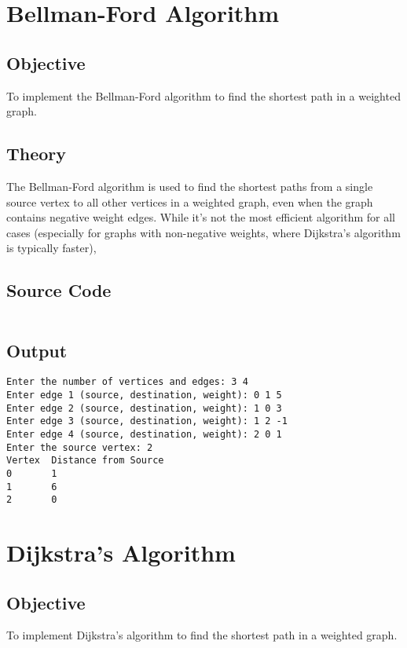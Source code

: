 \documentclass{korigamik}
\begin{document}
\pagebreak

\section{Bellman-Ford Algorithm}
\label{sec:Bellman-Ford Algorithm}

\subsection{Objective}
To implement the Bellman-Ford algorithm to find the shortest path
in a weighted graph.

\subsection{Theory}
The Bellman-Ford algorithm is used to find the shortest paths from a 
single source vertex to all other vertices in a weighted graph, even when the
graph contains negative weight edges. While it's not the most efficient
algorithm for all cases (especially for graphs with non-negative weights, where
Dijkstra's algorithm is typically faster),

\subsection{Source Code}
\inputminted[firstline=6, lastline=55, fontsize=\footnotesize]{cpp}{code/bellmanford.cpp}

\subsection{Output}
\begin{lstlisting}[style=output]
Enter the number of vertices and edges: 3 4
Enter edge 1 (source, destination, weight): 0 1 5
Enter edge 2 (source, destination, weight): 1 0 3
Enter edge 3 (source, destination, weight): 1 2 -1
Enter edge 4 (source, destination, weight): 2 0 1
Enter the source vertex: 2
Vertex  Distance from Source
0       1
1       6
2       0
\end{lstlisting}

\pagebreak

\section{Dijkstra's Algorithm}
\label{sec:Dijkstra's Algorithm}

\subsection{Objective}
To implement Dijkstra's algorithm to find the shortest path
in a weighted graph.
\end{document}
